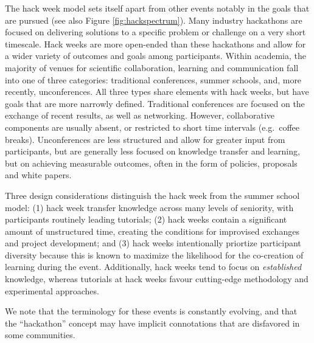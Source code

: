 The hack week model sets itself apart from other events notably in the goals that are pursued (see also Figure \ref{fig:hackspectrum}). 
Many industry hackathons are focused on delivering solutions to a specific problem or challenge on a very short timescale. 
Hack weeks are  more open-ended than these hackathons and allow for a wider variety of outcomes and goals among participants. Within academia, the majority of venues for scientific collaboration, learning and communication fall into one of three categories: traditional conferences, summer schools, and, more recently, unconferences. All three types share elements with hack weeks, but have goals that are more narrowly defined. 
Traditional conferences are focused on the exchange of recent results, as well as networking. However, collaborative components are usually absent, or restricted to short time intervals (e.g.\ coffee breaks). Unconferences are less structured and allow for greater input from participants, but are generally less focused on knowledge transfer and learning, but on achieving measurable outcomes, often in the form of policies, proposals and white papers. %

Three design considerations distinguish the hack week from the summer school model: (1) hack week transfer knowledge across many levels of seniority, with participants routinely leading tutorials; (2) hack weeks contain a significant amount of unstructured time, creating the conditions for improvised exchanges and project development; and (3) hack weeks intentionally priortize participant diversity because this is known to maximize the likelihood for the co-creation of learning during the event.  Additionally, hack weeks tend to focus on \textit{established} knowledge, whereas tutorials at hack weeks favour cutting-edge methodology and experimental approaches.

We note that the terminology for these events is constantly evolving, and that the ``hackathon'' concept may have implicit connotations that are disfavored in some communities.

